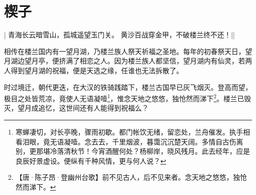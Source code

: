\chapter*{楔子}
\label{chap:preface}

\begin{pcontent}{|}
青海长云暗雪山，孤城遥望玉门关。
黄沙百战穿金甲，不破楼兰终不还！||
\end{pcontent}

相传在楼兰国内有一望月湖，乃楼兰族人祭天祈福之圣地。每年的初春祭天日，望月湖边望月亭，便挤满了相恋之人。因为楼兰族人都坚信，望月湖内有仙灵，若两人得到望月湖的祝福，便是天选之缘，任谁也无法拆散了。

时过境迁，朝代更迭，在大汉的铁骑践踏下，楼兰古国早已灰飞烟灭。登高而望，极目之处皆荒凉，竟使人无语凝噎\footnote{寒蝉凄切，对长亭晚，骤雨初歇。都门帐饮无绪，留恋处，兰舟催发。执手相看泪眼，竟无语凝噎。念去去，千里烟波，暮霭沉沉楚天阔。\cispace 多情自古伤离别，更那堪冷落清秋节！今宵酒醒何处？杨柳岸，晓风残月。此去经年，应是良辰好景虚设。便纵有千种风情，更与何人说？}，惟念天地之悠悠，独怆然而涕下\footnote{【唐·陈子昂·登幽州台歌】前不见古人，后不见来者。念天地之悠悠，独怆然而涕下。}。楼兰已毁灭，望月成追忆，这世间还有人能得到祝福么？



